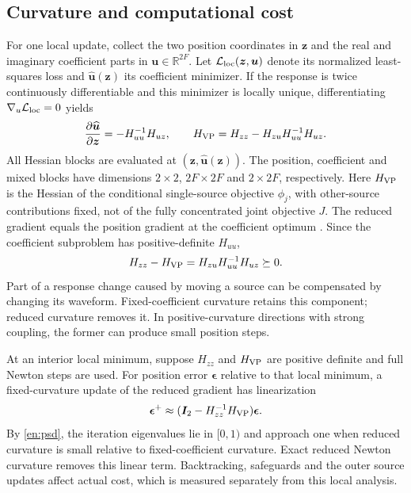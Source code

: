 \documentclass[a4paper,fleqn,review]{cas-sc}
\newcommand{\R}{\mathbb R}
\begin{document}
\FloatBarrier
\subsection{Curvature and computational cost}
For one local update, collect the two position coordinates in $\bm z$ and the real and imaginary coefficient parts in $\bm u\in\R^{2F}$. Let $\mathcal L_{\rm loc}(\bm z,\bm u)$ denote its normalized least-squares loss and $\widehat{\bm u}(\bm z)$ its coefficient minimizer. If the response is twice continuously differentiable and this minimizer is locally unique, differentiating $\nabla_u\mathcal L_{\rm loc}=0$ yields
\begin{equation}
\frac{\partial\widehat{\bm u}}{\partial\bm z}=-H_{uu}^{-1}H_{uz},\qquad
H_{\rm VP}=H_{zz}-H_{zu}H_{uu}^{-1}H_{uz}.
\label{en:schur}
\end{equation}
All Hessian blocks are evaluated at $(\bm z,\widehat{\bm u}(\bm z))$. The position, coefficient and mixed blocks have dimensions $2\times2$, $2F\times2F$ and $2\times2F$, respectively. Here $H_{\rm VP}$ is the Hessian of the conditional single-source objective $\phi_j$, with other-source contributions fixed, not of the fully concentrated joint objective $J$. The reduced gradient equals the position gradient at the coefficient optimum \cite{GolubPereyra1973}. Since the coefficient subproblem has positive-definite $H_{uu}$,
\begin{equation}
H_{zz}-H_{\rm VP}=H_{zu}H_{uu}^{-1}H_{uz}\succeq0.
\label{en:psd}
\end{equation}
Part of a response change caused by moving a source can be compensated by changing its waveform. Fixed-coefficient curvature retains this component; reduced curvature removes it. In positive-curvature directions with strong coupling, the former can produce small position steps.

At an interior local minimum, suppose $H_{zz}$ and $H_{\rm VP}$ are positive definite and full Newton steps are used. For position error $\bm\epsilon$ relative to that local minimum, a fixed-curvature update of the reduced gradient has linearization
\begin{equation}
\bm\epsilon^+\approx(\bm I_2-H_{zz}^{-1}H_{\rm VP})\bm\epsilon.
\label{en:rate}
\end{equation}
By \eqref{en:psd}, the iteration eigenvalues lie in $[0,1)$ and approach one when reduced curvature is small relative to fixed-coefficient curvature. Exact reduced Newton curvature removes this linear term. Backtracking, safeguards and the outer source updates affect actual cost, which is measured separately from this local analysis.
\end{document}
